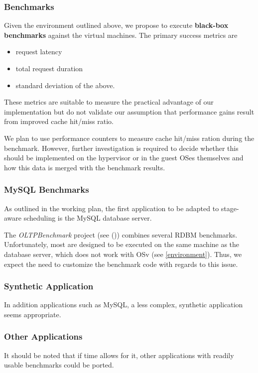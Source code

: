 \documentclass{article}
\begin{document}
\subsubsection{Benchmarks}

Given the environment outlined above, we propose to execute \textbf{black-box benchmarks} against the virtual machines.
The primary success metrics are
\begin{itemize}
    \item request latency
    \item total request duration
    \item standard deviation of the above.
\end{itemize}

These metrics are suitable to measure the practical advantage of our implementation but
do not validate our assumption that performance gains result from improved cache hit/miss ratio.

We plan to use performance counters to measure cache hit/miss ration during the benchmark.
However, further investigation is required to decide whether this should be implemented on the hypervisor or in the guest OSes themselves
and how this data is merged with the benchmark results.

\subsubsection{MySQL Benchmarks}

As outlined in the working plan, the first application to be adapted to stage-aware scheduling is the MySQL database server.

The \textit{OLTPBenchmark} project (see (\cite{oltpbench})) combines several RDBM benchmarks.
Unfortunately, most are designed to be executed on the same machine as the database server, which does not work with OSv (see \ref{environment}).
Thus, we expect the need to customize the benchmark code with regards to this issue.

\subsubsection{Synthetic Application}

In addition applications such as MySQL, a less complex, synthetic application seems appropriate.

\subsubsection{Other Applications}

It should be noted that if time allows for it, other applications with readily usable benchmarks could be ported.

\clearpage


\end{document}
